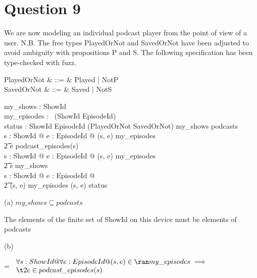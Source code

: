 \documentclass[a4paper,10pt,fleqn]{article}
\begin{document}
\bigskip

\setlength{\leftskip}{0pt}
\section*{Question 9}

\noindent We are now modeling an individual podcast player from the point of view of a user.  N.B. The free types PlayedOrNot and SavedOrNot have been adjusted to avoid ambiguity with propositions P and S. The following specification has been type-checked with fuzz. 

\bigskip

\begin{syntax}
PlayedOrNot & ::= & Played | NotP \\
SavedOrNot & ::= & Saved | NotS
\end{syntax}

\begin{axdef}
my\_shows : \finset ShowId \\
my\_episodes : \iseq~(ShowId \cross EpisodeId) \\
status : ShowId \cross EpisodeId \pfun (PlayedOrNot \cross SavedOrNot)
\where
my\_shows \subseteq podcasts \\
\forall s : ShowId @ \forall e : EpisodeId @ (s, e) \in \ran my\_episodes \implies \\
\t2 e \in podcast\_episodes(s) \\
\forall s : ShowId @ \forall e : EpisodeId @ (s, e) \in \ran my\_episodes \implies \\
\t2 s \in my\_shows \\
\forall s : ShowId @ \forall e : EpisodeId @ \\
\t2 (s, e) \in \ran my\_episodes \iff (s, e) \in \dom status
\end{axdef}

\noindent\hspace*{\parindent}(a) $my\_shows \subseteq podcasts$

\bigskip

\setlength{\leftskip}{\dimexpr\parindent+2em\relax}
\noindent The elements of the finite set of ShowId on this device must be elements of podcasts

\bigskip

\setlength{\leftskip}{0pt}
\medskip

\noindent\hspace*{\parindent}(b)

\setlength{\leftskip}{\dimexpr\parindent+2em\relax}
\savedleftskip=\leftskip
\noindent
$\displaystyle
\begin{array}{l}
\forall s : ShowId @ \forall e : EpisodeId @ (s, e) \in \ran my\_episodes \implies \\
\t2 e \in podcast\_episodes(s)
\end{array}$
\end{document}
